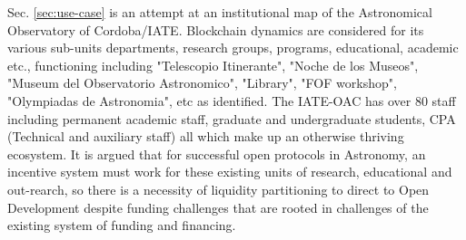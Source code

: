 \documentclass[final,5p,times,twocolumn,authoryear]{elsarticle}
\begin{document}
Sec. \ref{sec:use-case} is an attempt at an institutional map of the Astronomical Observatory of Cordoba/IATE. Blockchain dynamics are considered for its various sub-units departments, research groups, programs, educational, academic etc., functioning including "Telescopio Itinerante", "Noche de los Museos", "Museum del Observatorio Astronomico", "Library", "FOF workshop", "Olympiadas de Astronomia", etc as identified. The IATE-OAC has over 80 staff including permanent academic staff, graduate and undergraduate students,  CPA (Technical and auxiliary staff) all which make up an otherwise thriving ecosystem. It is argued that for successful open protocols in Astronomy, an incentive system must work for these existing units of research, educational and out-rearch, so there is a necessity of liquidity partitioning to direct to Open Development despite funding challenges that are rooted in challenges of the existing system of funding and financing.

\end{document}
